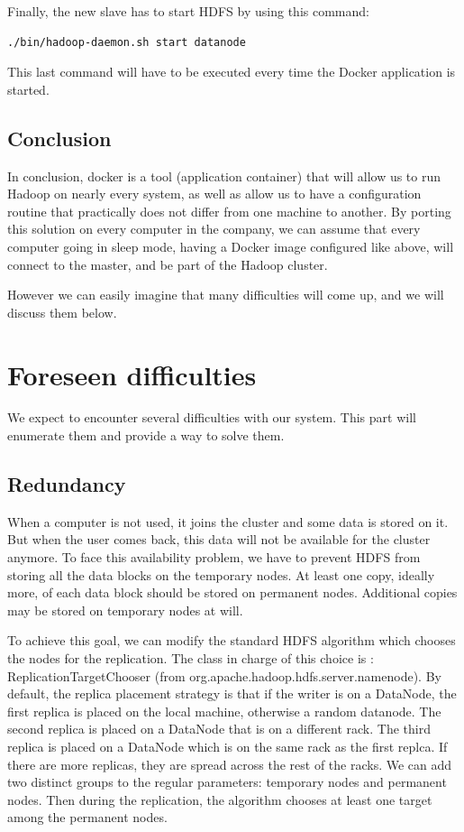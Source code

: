 \documentclass[11pt]{report} %
\begin{document}
Finally, the new slave has to start HDFS by using this command:
\begin{lstlisting}[language=bash]
./bin/hadoop-daemon.sh start datanode
\end{lstlisting}
This last command will have to be executed every time the Docker application is started.

\section{Conclusion}
In conclusion, docker is a tool (application container) that will allow us to run Hadoop on nearly every system, as well as allow us to have a configuration routine that practically does not differ from one machine to another. By porting this solution on every computer in the company, we can assume that every computer going in sleep mode, having a Docker image configured like above, will connect to the master, and be part of the Hadoop cluster.

However we can easily imagine that many difficulties will come up, and we will discuss them below.

\chapter{Foreseen difficulties}

We expect to encounter several difficulties with our system. This part will enumerate them and provide a way to solve them.

\section{Redundancy}
When a computer is not used, it joins the cluster and some data is stored on it. But when the user comes back, this data will not be available for the cluster anymore. To face this availability problem, we have to prevent HDFS from storing all the data blocks on the temporary nodes. At least one copy, ideally more, of each data block should be stored on permanent nodes. Additional copies may be stored on temporary nodes at will.

To achieve this goal, we can modify the standard HDFS algorithm which chooses the nodes for the replication. The class in charge of this choice is : ReplicationTargetChooser (from org.apache.hadoop.hdfs.server.namenode). By default, the replica placement strategy is that if the writer is on a DataNode, the first replica is placed on the local machine, otherwise a random datanode. The second replica is placed on a DataNode that is on a different rack. The third replica is placed on a DataNode which is on the same rack as the first replca. If there are more replicas, they are spread across the rest of the racks.
We can add two distinct groups to the regular parameters: temporary nodes and permanent nodes. Then during the replication, the algorithm chooses at least one target among the permanent nodes.
\end{document}
